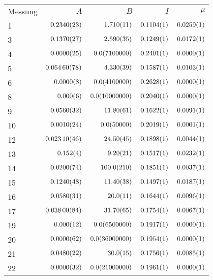 \begin{tabular}{l|r|r|r|r}
Messung & $A$ & $B$ & $I$ & $\mu$ \\
1 & $\num{0.234+-0.0023}$ & $\num{1.71+-0.011}$ & $\num{0.1104+-0.0001}$ & $\num{0.0259+-0.0001}$ \\
3 & $\num{0.137+-0.0027}$ & $\num{2.59+-0.035}$ & $\num{0.1249+-0.0001}$ & $\num{0.0172+-0.0001}$ \\
4 & $\num{0.0+-0.0025}$ & $\num{0+-710000.0}$ & $\num{0.2401+-0.0001}$ & $\num{0.0+-0.0001}$ \\
5 & $\num{0.0646+-0.00078}$ & $\num{4.33+-0.039}$ & $\num{0.1587+-0.0001}$ & $\num{0.0103+-0.0001}$ \\
6 & $\num{0.0+-0.0008}$ & $\num{0+-410000.0}$ & $\num{0.2628+-0.0001}$ & $\num{0.0+-0.0001}$ \\
8 & $\num{0.0+-0.006}$ & $\num{0+-1000000.0}$ & $\num{0.204+-0.0001}$ & $\num{0.0+-0.0001}$ \\
9 & $\num{0.056+-0.0032}$ & $\num{11.8+-0.61}$ & $\num{0.1622+-0.0001}$ & $\num{0.0091+-0.0001}$ \\
10 & $\num{0.001+-0.0024}$ & $\num{0+-5000.0}$ & $\num{0.2019+-0.0001}$ & $\num{0.0001+-0.0001}$ \\
12 & $\num{0.0231+-0.00046}$ & $\num{24.5+-0.45}$ & $\num{0.1898+-0.0001}$ & $\num{0.0044+-0.0001}$ \\
13 & $\num{0.152+-0.004}$ & $\num{9.2+-0.21}$ & $\num{0.1517+-0.0001}$ & $\num{0.0232+-0.0001}$ \\
14 & $\num{0.02+-0.0074}$ & $\num{100+-21.0}$ & $\num{0.1851+-0.0001}$ & $\num{0.0037+-0.0001}$ \\
15 & $\num{0.124+-0.0048}$ & $\num{11.4+-0.38}$ & $\num{0.1497+-0.0001}$ & $\num{0.0187+-0.0001}$ \\
16 & $\num{0.058+-0.0031}$ & $\num{20+-1.1}$ & $\num{0.1644+-0.0001}$ & $\num{0.0096+-0.0001}$ \\
17 & $\num{0.038+-0.00084}$ & $\num{31.7+-0.65}$ & $\num{0.1754+-0.0001}$ & $\num{0.0067+-0.0001}$ \\
19 & $\num{0.0+-0.012}$ & $\num{0+-650000.0}$ & $\num{0.1917+-0.0001}$ & $\num{0.0+-0.0001}$ \\
20 & $\num{0.0+-0.0062}$ & $\num{0+-3600000.0}$ & $\num{0.1954+-0.0001}$ & $\num{0.0+-0.0001}$ \\
21 & $\num{0.048+-0.0022}$ & $\num{30+-1.5}$ & $\num{0.1756+-0.0001}$ & $\num{0.0085+-0.0001}$ \\
22 & $\num{0.0+-0.0032}$ & $\num{0+-2100000.0}$ & $\num{0.1961+-0.0001}$ & $\num{0.0+-0.0001}$ \\

\end{tabular}
